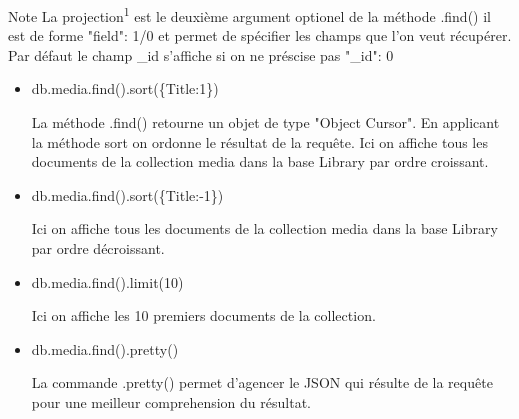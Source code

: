     \begin{block}{Note}
         La projection\textsuperscript{1} est le deuxième argument optionel de la méthode .find() il est de forme "field": 1/0 et permet de spécifier les champs que l'on veut récupérer. Par défaut le champ \_id s'affiche si on ne préscise pas {"\_id": 0} 
    \end{block}

{\let\thefootnote\relax{}}

    \begin{itemize}
        \item \begin{tt} db.media.find().sort(\{Title:1\}) \end{tt} \newline
        La méthode .find() retourne un objet de type "Object Cursor". En applicant la méthode sort on ordonne le résultat de la requête. Ici on affiche tous les documents de la collection media dans la base Library par ordre croissant. 
        \item \begin{tt} db.media.find().sort(\{Title:-1\}) \end{tt} \newline
        Ici on affiche tous les documents de la collection media dans la base Library par ordre décroissant.
        \item \begin{tt} db.media.find().limit(10) \end{tt} \newline
        Ici on affiche les 10 premiers documents de la collection.
        
        \item \begin{tt} db.media.find().pretty() \end{tt} \newline
        La commande .pretty() permet d'agencer le JSON qui résulte de la requête pour une meilleur comprehension du résultat.
    \end{itemize}
    
